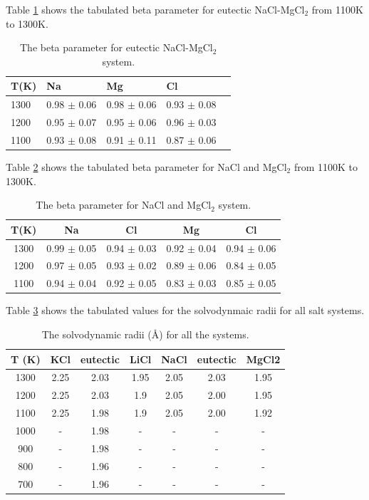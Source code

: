\documentclass[review]{elsarticle}
\begin{document}
Table \ref{table:nacl-mgcl2-beta} shows the tabulated beta parameter for eutectic NaCl-MgCl$_2$ from 1100K to 1300K. 
\begin{table}[h!]
\centering
\caption{The beta parameter for eutectic NaCl-MgCl$_2$ system. }
\begin{tabular}{lllll}
\hline
T(K) & Na          & Mg          & Cl          &  \\
\hline
1300 & 0.98 $\pm$ 0.06 & 0.98 $\pm$ 0.06 & 0.93 $\pm$ 0.08 &  \\
1200 & 0.95 $\pm$ 0.07 & 0.95 $\pm$ 0.06 & 0.96 $\pm$ 0.03 &  \\
1100 & 0.93 $\pm$ 0.08 & 0.91 $\pm$ 0.11 & 0.87 $\pm$ 0.06 &  \\
\hline
\end{tabular}
\label{table:nacl-mgcl2-beta}
\end{table} 
\FloatBarrier

Table \ref{table:nacl_and_mgcl2-beta} shows the tabulated beta parameter for NaCl and MgCl$_2$ from 1100K to 1300K. 
\begin{table}[h!]
\centering
\caption{The beta parameter for NaCl and MgCl$_2$ system. }
\begin{tabular}{|c|cc|cc|}
\hline
T(K) & Na          & Cl          & Mg          & Cl          \\
\hline
1300 & 0.99 $\pm$ 0.05 & 0.94 $\pm$ 0.03 & 0.92 $\pm$ 0.04 & 0.94 $\pm$ 0.06 \\
1200 & 0.97 $\pm$ 0.05 & 0.93 $\pm$ 0.02 & 0.89 $\pm$ 0.06 & 0.84 $\pm$ 0.05 \\
1100 & 0.94 $\pm$ 0.04 & 0.92 $\pm$ 0.05 & 0.83 $\pm$ 0.03 & 0.85 $\pm$ 0.05 \\
\hline
\end{tabular}
\label{table:nacl_and_mgcl2-beta}
\end{table} 
Table \ref{Table:solvodynamic} shows the tabulated values for the solvodynmaic radii for all salt systems.
\begin{table}[]
\centering
\caption{The solvodynamic radii (\AA) for all the systems.}
\begin{tabular}{|c|ccc|ccc|}
\hline
T (K) & KCl  & eutectic & LiCl & NaCl & eutectic & MgCl2 \\
\hline
1300  & 2.25 & 2.03     & 1.95 & 2.05 & 2.03     & 1.95  \\
1200  & 2.25 & 2.03     & 1.9  & 2.05 & 2.00     & 1.95  \\
1100  & 2.25 & 1.98     & 1.9  & 2.05 & 2.00     & 1.92  \\
1000  &   -   & 1.98     &  -    &  -    &     -     &   -    \\
900   &   -   & 1.98     &  -    &  -    &     -     &   -    \\
800   &   -   & 1.96     &  -    &  -    &     -     &   -    \\
700   &   -   & 1.96     &  -    &  -    &     -     &   -   \\
\hline
\end{tabular}
\label{Table:solvodynamic}
\end{table}
\FloatBarrier

\end{document}
